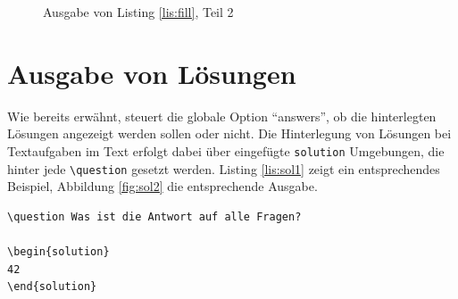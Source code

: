 \begin{figure}
\caption{Ausgabe von Listing \ref{lis:fill}, Teil 2}\label{fig:fill2}
\end{figure}

\section{Ausgabe von Lösungen}

Wie bereits erwähnt, steuert die globale Option \enquote{answers}, ob die hinterlegten Lösungen angezeigt werden sollen oder nicht. 
Die Hinterlegung von Lösungen bei Textaufgaben im Text erfolgt dabei über eingefügte \texttt{solution} Umgebungen, die hinter jede \texttt{\textbackslash question} gesetzt werden.
Listing \ref{lis:sol1} zeigt ein entsprechendes Beispiel, Abbildung \ref{fig:sol2} die entsprechende Ausgabe.

\begin{lstlisting}[label={lis:sol1},caption={Beispielhafte Lösung}]
\question Was ist die Antwort auf alle Fragen?

\begin{solution}
42
\end{solution}
\end{lstlisting}

